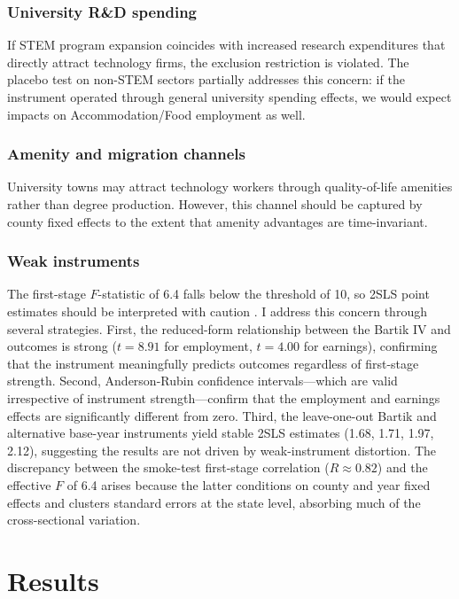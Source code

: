 \documentclass[12pt]{article}
\begin{document}
\subsubsection*{University R\&D spending} If STEM program expansion coincides with increased research expenditures that directly attract technology firms, the exclusion restriction is violated. The placebo test on non-STEM sectors partially addresses this concern: if the instrument operated through general university spending effects, we would expect impacts on Accommodation/Food employment as well.

\subsubsection*{Amenity and migration channels} University towns may attract technology workers through quality-of-life amenities rather than degree production. However, this channel should be captured by county fixed effects to the extent that amenity advantages are time-invariant.

\subsubsection*{Weak instruments} The first-stage $F$-statistic of 6.4 falls below the \citet{stock2005testing} threshold of 10, so 2SLS point estimates should be interpreted with caution \citep{andrews2019weak, lee2022valid}. I address this concern through several strategies. First, the reduced-form relationship between the Bartik IV and outcomes is strong ($t = 8.91$ for employment, $t = 4.00$ for earnings), confirming that the instrument meaningfully predicts outcomes regardless of first-stage strength. Second, Anderson-Rubin confidence intervals---which are valid irrespective of instrument strength---confirm that the employment and earnings effects are significantly different from zero. Third, the leave-one-out Bartik and alternative base-year instruments yield stable 2SLS estimates (1.68, 1.71, 1.97, 2.12), suggesting the results are not driven by weak-instrument distortion. The discrepancy between the smoke-test first-stage correlation ($R \approx 0.82$) and the effective $F$ of 6.4 arises because the latter conditions on county and year fixed effects and clusters standard errors at the state level, absorbing much of the cross-sectional variation.

\section{Results}
\end{document}
